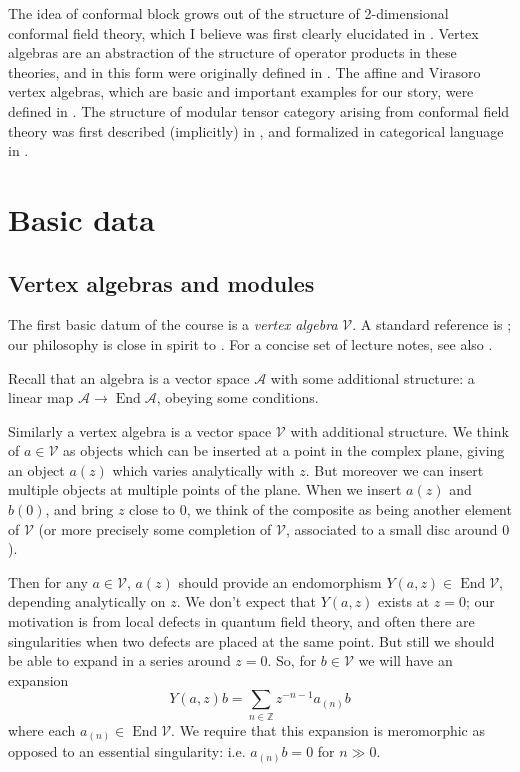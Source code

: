 \documentclass[12pt,letterpaper,reqno]{amsart}
\numberwithin{equation}{section}
\newcommand{\cA}{\ensuremath{\mathcal A}}
\newcommand{\bbZ}{\ensuremath{\mathbb Z}}
\newcommand{\vertex}{\mathcal{V}}
\newcommand{\ti}[1]{\textit{#1}}
\DeclareMathOperator{\End}{End}
\DeclareRobustCommand{\fixme}[1]{\leavevmode{\color{orange}[#1]}}
\begin{document}
The idea of conformal block grows out of the structure of 2-dimensional conformal field
theory, which I believe was first clearly elucidated in \cite{BPZ1984}.
Vertex algebras are an abstraction of the structure of operator products
in these theories, and in this form were originally defined in \cite{Borcherds1986}.
The affine and Virasoro vertex algebras, which are basic and important examples for our story,
were defined in \cite{FrenkelKac1980,FrenkelZhu1992}.
The structure of modular tensor category arising from conformal field theory 
was first described (implicitly) in \cite{MooreSeiberg1989ClassicalQuantum},
and formalized in categorical language in \cite{Turaev1992ModularCategories}.
\fixme{...}

\section{Basic data}

\subsection{Vertex algebras and modules}

The first basic datum of the course is a 
\ti{vertex algebra} $\vertex$. 
A standard reference is
\cite{kac1998vertex}; our philosophy is close in spirit to
\cite{FrenkelBenZvi2004VertexAlgebrasCurves}. For a concise set of lecture notes,
see also \cite{Gui2022VOALectures}.

Recall that an algebra is a vector space $\cA$ with some additional
structure: a linear map $\cA \to \End \cA$, obeying some conditions.

Similarly a vertex algebra is a vector space $\vertex$ with additional structure.
We think of $a \in \vertex$ as objects which can be inserted at a point in the complex plane, giving an object $a(z)$ which varies analytically with $z$. But moreover we can insert multiple objects
at multiple points of the plane.
When we insert $a(z)$ and $b(0)$, and bring $z$ close to 
$0$, we think of the composite as being another 
element of $\vertex$ (or more precisely some completion of
$\vertex$, associated to a small disc around $0$).

Then for any $a \in \vertex$, 
$a(z)$ should provide an endomorphism $Y(a,z) \in \End \vertex$,
depending analytically on $z$.
We don't expect that $Y(a,z)$ exists at $z = 0$; our motivation is
from local defects in quantum field theory, and often there are
singularities when two defects are placed at the same point.
But still we should be able to expand in a series around $z = 0$.
So, for $b \in \vertex$ we will have an expansion
\begin{equation} \label{eq:y-series}
  Y(a,z) b = \sum_{n \in \bbZ} z^{-n-1} a_{(n)} b
\end{equation}
where each $a_{(n)} \in \End \vertex$. We require
that this expansion is meromorphic as opposed to an essential
singularity: i.e. $a_{(n)} b = 0$ for $n \gg 0$.
\end{document}
